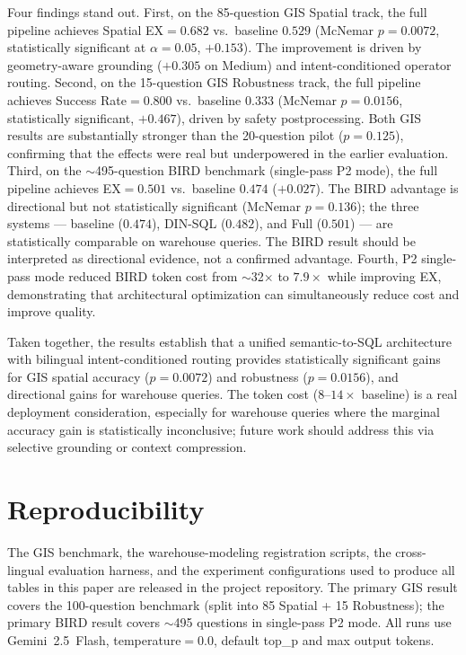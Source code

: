 \documentclass[11pt]{article}
\begin{document}
Four findings stand out. First, on the 85-question GIS Spatial track, the full pipeline achieves Spatial EX$=0.682$ vs.\ baseline $0.529$ (McNemar $p=0.0072$, statistically significant at $\alpha=0.05$, $+0.153$). The improvement is driven by geometry-aware grounding ($+0.305$ on Medium) and intent-conditioned operator routing. Second, on the 15-question GIS Robustness track, the full pipeline achieves Success Rate$=0.800$ vs.\ baseline $0.333$ (McNemar $p=0.0156$, statistically significant, $+0.467$), driven by safety postprocessing. Both GIS results are substantially stronger than the 20-question pilot ($p=0.125$), confirming that the effects were real but underpowered in the earlier evaluation. Third, on the $\sim$495-question BIRD benchmark (single-pass P2 mode), the full pipeline achieves EX$=0.501$ vs.\ baseline $0.474$ ($+0.027$). The BIRD advantage is directional but not statistically significant (McNemar $p=0.136$); the three systems --- baseline ($0.474$), DIN-SQL ($0.482$), and Full ($0.501$) --- are statistically comparable on warehouse queries. The BIRD result should be interpreted as directional evidence, not a confirmed advantage. Fourth, P2 single-pass mode reduced BIRD token cost from $\sim$32$\times$ to $7.9\times$ while improving EX, demonstrating that architectural optimization can simultaneously reduce cost and improve quality.

Taken together, the results establish that a unified semantic-to-SQL architecture with bilingual intent-conditioned routing provides statistically significant gains for GIS spatial accuracy ($p=0.0072$) and robustness ($p=0.0156$), and directional gains for warehouse queries. The token cost ($8$--$14\times$ baseline) is a real deployment consideration, especially for warehouse queries where the marginal accuracy gain is statistically inconclusive; future work should address this via selective grounding or context compression.

\section*{Reproducibility}
The GIS benchmark, the warehouse-modeling registration scripts, the cross-lingual evaluation harness, and the experiment configurations used to produce all tables in this paper are released in the project repository. The primary GIS result covers the 100-question benchmark (split into 85 Spatial + 15 Robustness); the primary BIRD result covers $\sim$495 questions in single-pass P2 mode. All runs use Gemini~2.5~Flash, temperature$=0.0$, default top\_p and max output tokens.
\end{document}
